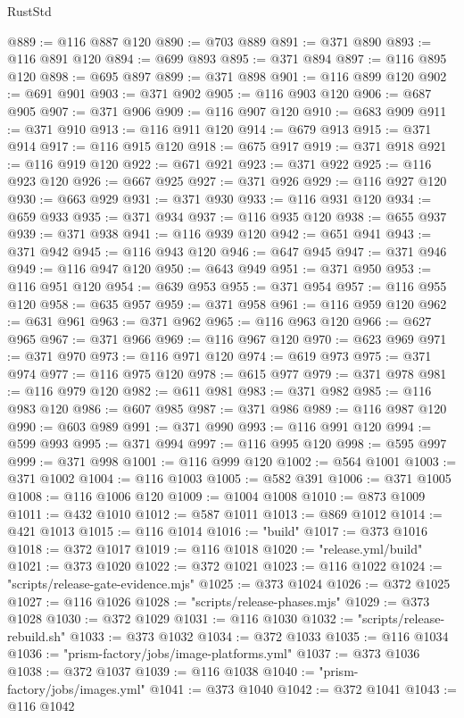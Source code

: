 \begin{lexlean}{RustStd}
\begin{coremodule}
@889 := @116 @887 @120
@890 := @703 @889
@891 := @371 @890
@893 := @116 @891 @120
@894 := @699 @893
@895 := @371 @894
@897 := @116 @895 @120
@898 := @695 @897
@899 := @371 @898
@901 := @116 @899 @120
@902 := @691 @901
@903 := @371 @902
@905 := @116 @903 @120
@906 := @687 @905
@907 := @371 @906
@909 := @116 @907 @120
@910 := @683 @909
@911 := @371 @910
@913 := @116 @911 @120
@914 := @679 @913
@915 := @371 @914
@917 := @116 @915 @120
@918 := @675 @917
@919 := @371 @918
@921 := @116 @919 @120
@922 := @671 @921
@923 := @371 @922
@925 := @116 @923 @120
@926 := @667 @925
@927 := @371 @926
@929 := @116 @927 @120
@930 := @663 @929
@931 := @371 @930
@933 := @116 @931 @120
@934 := @659 @933
@935 := @371 @934
@937 := @116 @935 @120
@938 := @655 @937
@939 := @371 @938
@941 := @116 @939 @120
@942 := @651 @941
@943 := @371 @942
@945 := @116 @943 @120
@946 := @647 @945
@947 := @371 @946
@949 := @116 @947 @120
@950 := @643 @949
@951 := @371 @950
@953 := @116 @951 @120
@954 := @639 @953
@955 := @371 @954
@957 := @116 @955 @120
@958 := @635 @957
@959 := @371 @958
@961 := @116 @959 @120
@962 := @631 @961
@963 := @371 @962
@965 := @116 @963 @120
@966 := @627 @965
@967 := @371 @966
@969 := @116 @967 @120
@970 := @623 @969
@971 := @371 @970
@973 := @116 @971 @120
@974 := @619 @973
@975 := @371 @974
@977 := @116 @975 @120
@978 := @615 @977
@979 := @371 @978
@981 := @116 @979 @120
@982 := @611 @981
@983 := @371 @982
@985 := @116 @983 @120
@986 := @607 @985
@987 := @371 @986
@989 := @116 @987 @120
@990 := @603 @989
@991 := @371 @990
@993 := @116 @991 @120
@994 := @599 @993
@995 := @371 @994
@997 := @116 @995 @120
@998 := @595 @997
@999 := @371 @998
@1001 := @116 @999 @120
@1002 := @564 @1001
@1003 := @371 @1002
@1004 := @116 @1003
@1005 := @582 @391
@1006 := @371 @1005
@1008 := @116 @1006 @120
@1009 := @1004 @1008
@1010 := @873 @1009
@1011 := @432 @1010
@1012 := @587 @1011
@1013 := @869 @1012
@1014 := @421 @1013
@1015 := @116 @1014
@1016 := "build"
@1017 := @373 @1016
@1018 := @372 @1017
@1019 := @116 @1018
@1020 := "release.yml/build"
@1021 := @373 @1020
@1022 := @372 @1021
@1023 := @116 @1022
@1024 := "scripts/release-gate-evidence.mjs"
@1025 := @373 @1024
@1026 := @372 @1025
@1027 := @116 @1026
@1028 := "scripts/release-phases.mjs"
@1029 := @373 @1028
@1030 := @372 @1029
@1031 := @116 @1030
@1032 := "scripts/release-rebuild.sh"
@1033 := @373 @1032
@1034 := @372 @1033
@1035 := @116 @1034
@1036 := "prism-factory/jobs/image-platforms.yml"
@1037 := @373 @1036
@1038 := @372 @1037
@1039 := @116 @1038
@1040 := "prism-factory/jobs/images.yml"
@1041 := @373 @1040
@1042 := @372 @1041
@1043 := @116 @1042

\end{coremodule}
\end{lexlean}
